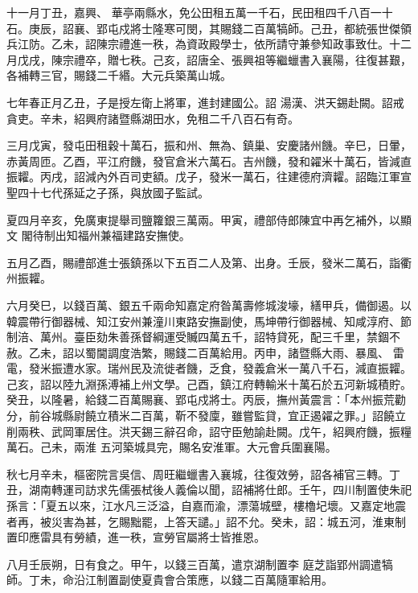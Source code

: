 \begin{pinyinscope}
 十一月丁丑，嘉興、
 華亭兩縣水，免公田租五萬一千石，民田租四千八百一十石。庚辰，詔襄、郢屯戍將士隆寒可閔，其賜錢二百萬犒師。己丑，都統張世傑領兵江防。乙未，詔陳宗禮進一秩，為資政殿學士，依所請守兼參知政事致仕。十二月戊戌，陳宗禮卒，贈七秩。己亥，詔唐全、張興祖等繼蠟書入襄陽，往復甚艱，各補轉三官，賜錢二千緡。大元兵築萬山城。



 七年春正月乙丑，子是授左衛上將軍，進封建國公。詔
 湯漢、洪天錫赴闕。詔戒貪吏。辛未，紹興府諸暨縣湖田水，免租二千八百石有奇。



 三月戊寅，發屯田租穀十萬石，振和州、無為、鎮巢、安慶諸州饑。辛巳，日暈，赤黃周匝。乙酉，平江府饑，發官倉米六萬石。吉州饑，發和糴米十萬石，皆減直振糶。丙戌，詔減內外百司吏額。戊子，發米一萬石，往建德府濟糶。詔臨江軍宣聖四十七代孫延之子孫，與放國子監試。



 夏四月辛亥，免廣東提舉司鹽籮銀三萬兩。甲寅，禮部侍郎陳宜中再乞補外，以顯文
 閣待制出知福州兼福建路安撫使。



 五月乙酉，賜禮部進士張鎮孫以下五百二人及第、出身。壬辰，發米二萬石，詣衢州振糶。



 六月癸巳，以錢百萬、銀五千兩命知嘉定府昝萬壽修城浚壕，繕甲兵，備御遏。以韓震帶行御器械、知江安州兼潼川東路安撫副使，馬坤帶行御器械、知咸淳府、節制涪、萬州。臺臣劾朱善孫督綱運受贓四萬五千，詔特貸死，配三千里，禁錮不赦。乙未，詔以蜀閫調度浩繁，賜錢二百萬給用。丙申，諸暨縣大雨、暴風、
 雷電，發米振遭水家。瑞州民及流徙者饑，乏食，發義倉米一萬八千石，減直振糶。己亥，詔以陸九淵孫溥補上州文學。己酉，鎮江府轉輸米十萬石於五河新城積貯。癸丑，以隆暑，給錢二百萬賜襄、郢屯戍將士。丙辰，撫州黃震言：「本州振荒勸分，前谷城縣尉饒立積米二百萬，靳不發廩，雖嘗監貸，宜正遏糴之罪。」詔饒立削兩秩、武岡軍居住。洪天錫三辭召命，詔守臣勉諭赴闕。戊午，紹興府饑，振糧萬石。己未，兩淮
 五河築城具完，賜名安淮軍。大元會兵圍襄陽。



 秋七月辛未，樞密院言吳信、周旺繼蠟書入襄城，往復效勞，詔各補官三轉。丁丑，湖南轉運司訪求先儒張栻後人義倫以聞，詔補將仕郎。壬午，四川制置使朱祀孫言：「夏五以來，江水凡三泛溢，自嘉而渝，漂蕩城壁，樓櫓圮壞。又嘉定地震者再，被災害為甚，乞賜黜罷，上答天譴。」詔不允。癸未，詔：城五河，淮東制置印應雷具有勞績，進一秩，宣勞官屬將士皆推恩。



 八月壬辰朔，日有食之。甲午，以錢三百萬，遣京湖制置李
 庭芝詣郢州調遣犒師。丁未，命沿江制置副使夏貴會合策應，以錢二百萬隨軍給用。




\end{pinyinscope}
